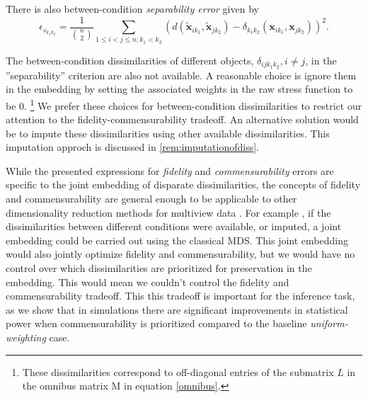 \documentclass[12pt,oneside,final]{thesis}
\begin{document}
 There is also between-condition {\em separability error} given by
    $$\epsilon_{s_{k_1k_2}} = \frac{1}{{{n}\choose{2}}} \sum_{1 \leq i < j \leq n;k_1 <k_2} (d(\widetilde{\bm{x}}_{ik_1},\widetilde{\bm{x}}_{jk_2})-{ \delta_{k_1k_2}}(\bm{x}_{ik_1},\bm{x}_{jk_2}))^2.$$
    


 The between-condition dissimilarities of different objects, ${ \delta_{ijk_1k_2}}, i\neq j$, in the ''separability'' criterion are also not available. A  reasonable choice is  ignore them in the embedding by setting the associated weights in the raw stress function to be 0. \footnote{These dissimilarities correspond to  off-diagonal  entries of the  submatrix $L$ in   the omnibus matrix  M in equation \eqref{omnibus}.}  
 We prefer these choices for between-condition dissimilarities to  restrict our attention to  the fidelity-commensurability tradeoff. An alternative solution would be to impute these dissimilarities using other available dissimilarities. This imputation approch is discussed in \ref{rem:imputationofdiss}.
  



While  the presented  expressions for  \emph{fidelity} and  \emph{commensurability} errors  are specific to the joint embedding of disparate dissimilarities, the concepts of fidelity and commensurability are  general enough to be applicable to other dimensionality reduction methods for multiview data .  For example , if the dissimilarities between different conditions were available, or imputed, a joint embedding could be carried out using the classical MDS. This joint embedding would also jointly optimize fidelity  and commensurability, but we would have no control over which dissimilarities are prioritized for preservation in the embedding. This would mean we couldn't control the fidelity and commensurability tradeoff. This this tradeoff is important for the inference task, as we show that  in simulations  there are significant improvements in statistical power when commensurability is prioritized compared to the baseline \emph{uniform-weighting} case.
   
\end{document}
